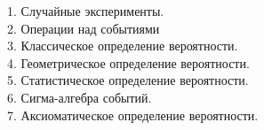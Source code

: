 1. Случайные эксперименты. \\
 


2. Операции над событиями \\
 


3. Классическое определение вероятности. \\



4. Геометрическое определение вероятности. \\



5. Статистическое определение вероятности. \\


6. Сигма-алгебра событий. \\


7. Аксиоматическое определение вероятности. \\

